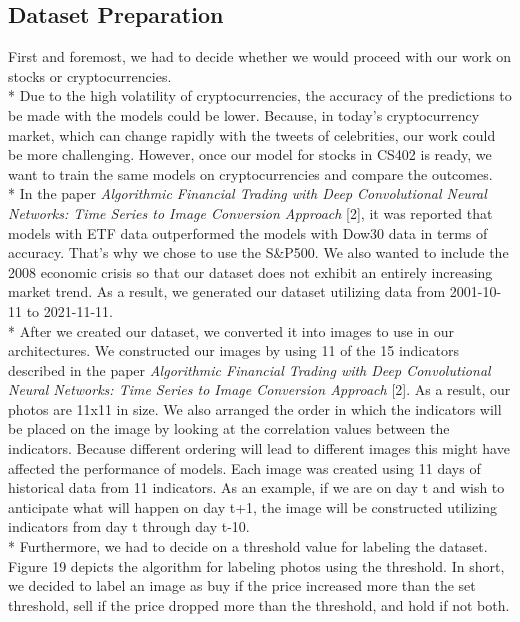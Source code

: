 \documentclass{article}
\begin{document}
\subsection{Dataset Preparation}
First and foremost, we had to decide whether we would proceed with our work on stocks or cryptocurrencies.\vspace{0.2cm}\\*
Due to the high volatility of cryptocurrencies, the accuracy of the predictions to be made with the models could be lower. Because, in today's cryptocurrency market, which can change rapidly with the tweets of celebrities, our work could be more challenging. However, once our model for stocks in CS402 is ready, we want to train the same models on cryptocurrencies and compare the outcomes. \vspace{0.01cm} \\*
In the paper \textit{Algorithmic Financial Trading with Deep Convolutional Neural Networks: Time Series to Image Conversion Approach} [2], it was reported that models with ETF data outperformed the models with Dow30 data in terms of accuracy. That's why we chose to use the S\&P500. We also wanted to include the 2008 economic crisis so that our dataset does not exhibit an entirely increasing market trend. As a result, we generated our dataset utilizing data from 2001-10-11 to 2021-11-11.\vspace{0.1cm}\\*
After we created our dataset, we converted it into images to use in our architectures. We constructed our images by using 11 of the 15 indicators described in the paper \textit{Algorithmic Financial Trading with Deep Convolutional Neural Networks: Time Series to Image Conversion Approach} [2]. As a result, our photos are 11x11 in size.
We also arranged the order in which the indicators will be placed on the image by looking at the correlation values between the indicators. Because different ordering will lead to different images this might have affected the performance of models.
Each image was created using 11 days of historical data from 11 indicators. As an example, if we are on day t and wish to anticipate what will happen on day t+1, the image will be constructed utilizing indicators from day t through day t-10.\vspace{0.1cm}\\*
Furthermore, we had to decide on a threshold value for labeling the dataset. Figure 19 depicts the algorithm for labeling photos using the threshold. In short, we decided to label an image as buy if the price increased more than the set threshold, sell if the price dropped more than the threshold, and hold if not both.
\end{document}
